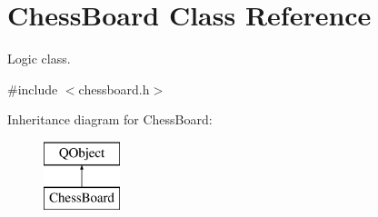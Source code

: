 \hypertarget{class_chess_board}{}\section{Chess\+Board Class Reference}
\label{class_chess_board}


Logic class.  




{\ttfamily \#include $<$chessboard.\+h$>$}

Inheritance diagram for Chess\+Board\+:\begin{figure}[H]
\begin{center}
\leavevmode
\includegraphics[height=2.000000cm]{class_chess_board}
\end{center}
\end{figure}
